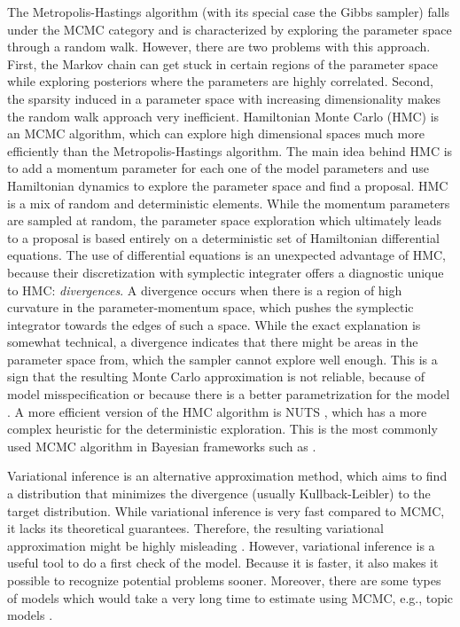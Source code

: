 The Metropolis-Hastings algorithm (with its special case the Gibbs sampler) falls under the MCMC category and is characterized by exploring the parameter space through a random walk.
However, there are two problems with this approach.
First, the Markov chain can get stuck in certain regions of the parameter space while exploring posteriors where the parameters are highly correlated.
Second, the sparsity induced in a parameter space with increasing dimensionality makes the random walk approach very inefficient.
Hamiltonian Monte Carlo (HMC) is an MCMC algorithm, which can explore high dimensional spaces much more efficiently than the Metropolis-Hastings algorithm.
The main idea behind HMC is to add a momentum parameter for each one of the model parameters and use Hamiltonian dynamics to explore the parameter space and find a proposal.
HMC is a mix of random and deterministic elements.
While the momentum parameters are sampled at random, the parameter space exploration which ultimately leads to a proposal is based entirely on a deterministic set of Hamiltonian differential equations.
The use of differential equations is an unexpected advantage of HMC, because their discretization with symplectic integrater offers a diagnostic unique to HMC: \textit{divergences}.
A divergence occurs when there is a region of high curvature in the parameter-momentum space, which pushes the symplectic integrator towards the edges of such a space.
While the exact explanation is somewhat technical, a divergence indicates that there might be areas in the parameter space from, which the sampler cannot explore well enough.
This is a sign that the resulting Monte Carlo approximation is not reliable, because of model misspecification or because there is a better parametrization for the model \citep{betancourt_conceptual_2017, neal_mcmc_2011}.
A more efficient version of the HMC algorithm is NUTS \citep{hoffman_no-u-turn_2014}, which has a more complex heuristic for the deterministic exploration.
This is the most commonly used MCMC algorithm in Bayesian frameworks such as .

Variational inference is an alternative approximation method, which aims to find a distribution that minimizes the divergence (usually Kullback-Leibler) to the target distribution.
While variational inference is very fast compared to MCMC, it lacks its theoretical guarantees.
Therefore, the resulting variational approximation might be highly misleading \citep{blei_variational_2017}.
However, variational inference is a useful tool to do a first check of the model.
Because it is faster, it also makes it possible to recognize potential problems sooner.
Moreover, there are some types of models which would take a very long time to estimate using MCMC, e.g., topic models \citep{blei_latent_2003}.


